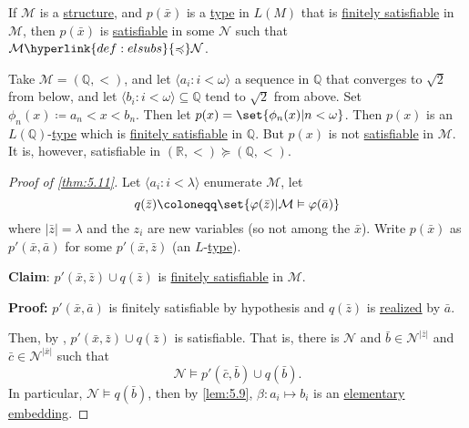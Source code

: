 \documentclass{article}
\let\models\vDash
\begin{document}
\begin{nthm}\label{thm:5.11}
  If $\mathcal{M}$ is a \hyperlink{def:str}{structure}, and $p(\bar{x})$ is a \hyperlink{def:type}{type} in $L(M)$ that is \hyperlink{def:type}{finitely satisfiable} in $\mathcal{M}$, then $p(\bar{x})$ is \hyperlink{def:type}{satisfiable} in some $\mathcal{N}$ such that $\mathcal{M} \hyperlink{def:elsubs}{\preccurlyeq} \mathcal{N}$.
\end{nthm}
\begin{eg}
  Take $\mathcal{M} = (\mathbb{Q}, <)$, and let $\langle a_i : i < \omega \rangle$ a sequence in $\mathbb{Q}$ that converges to $\sqrt{2}$ from below, and let $\langle b_i : i < \omega \rangle \subseteq \mathbb{Q}$ tend to $\sqrt{2}$ from above.
  Set $\phi_n(x) \coloneqq a_n < x < b_n$. Then let $p(x) = \set{\phi_n(x) | n < \omega}$.
  Then $p(x)$ is an $L(\mathbb{Q})$-\hyperlink{def:type}{type} which is \hyperlink{def:type}{finitely satisfiable} in $\mathbb{Q}$.
  But $p(x)$ is not \hyperlink{def:type}{satisfiable} in $\mathcal{M}$.
  It is, however, satisfiable in $(\mathbb{R}, <) \succcurlyeq (\mathbb{Q}, <)$.
\end{eg}
\begin{proof}[Proof of \cref{thm:5.11}]
  Let $\langle a_i : i < \lambda \rangle$ enumerate $\mathcal{M}$, let
  \begin{equation*}q(\bar{z}) \coloneqq \set{\varphi(\bar{z}) | \mathcal{M} \models \varphi(\bar{a})}\end{equation*}
  where $|\bar{z}| = \lambda$ and the $z_i$ are new variables (so not among the $\bar{x}$).
  Write $p(\bar{x})$ as $p'(\bar{x}, \bar{a})$ for some $p'(\bar{x}, \bar{z})$ (an $L$-\hyperlink{def:type}{type}).

  \textbf{Claim}: $p'(\bar{x},\bar{z}) \cup q(\bar{z})$ is \hyperlink{def:type}{finitely satisfiable} in $\mathcal{M}$.

  \textbf{Proof:} $p'(\bar{x},\bar{a})$ is finitely satisfiable by hypothesis and $q(\bar{z})$ is \hyperlink{def:type}{realized} by $\bar{a}$.

  Then, by , $p'(\bar{x}, \bar{z}) \cup q(\bar{z})$ is satisfiable.
  That is, there is $\mathcal{N}$ and $\bar{b} \in \mathcal{N}^{|\bar{z}|}$ and $\bar{c} \in \mathcal{N}^{|\bar{x}|}$ such that
  \begin{equation*}
    \mathcal{N} \models p'(\bar{c}, \bar{b}) \cup q(\bar{b}).
  \end{equation*}
  In particular, $\mathcal{N} \models q(\bar{b})$, then by \cref{lem:5.9}, $\beta: a_i \mapsto b_i$ is an \hyperlink{def:el}{elementary embedding}.
\end{proof}
\end{document}
